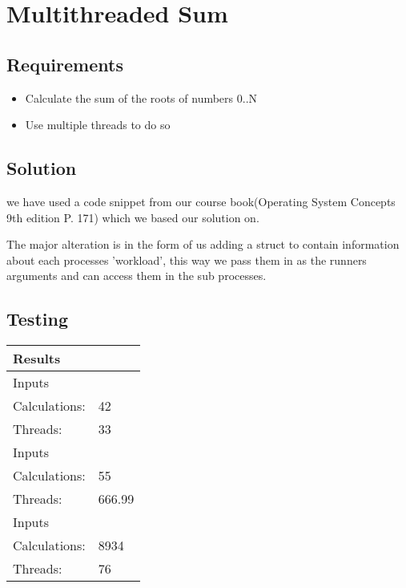 \chapter{Multithreaded Sum}

\section{Requirements}

\begin{itemize}
\item Calculate the sum of the roots of numbers 0..N
\item Use multiple threads to do so
\end{itemize}

\section{Solution}
we have used a code snippet from our course book(Operating System Concepts 9th edition P. 171) which we based our solution on.

The major alteration is in the form of us adding a struct to contain information about each processes 'workload', this way we pass them in as the runners arguments and can access them in the sub processes.

\section{Testing}



\newcommand{\tblhead}[1] {
\multicolumn{2}{l}{#1}\\
\hline
}

\newcommand{\row}[2] {
\hline
\rowcolor{gr1}
Inputs&\\
\hline \hline
\rowcolor{gr2}
Calculations: & #1 \\
\hline
\rowcolor{gr2}
Threads: & #2 \\
\hline \hline
}

\newcommand{\botrow}[2] {
\hline
\rowcolor{gr1}
Inputs&\\
\hline \hline
\rowcolor{gr2}
Calculations: & #1 \\
\hline
\rowcolor{gr2}
Threads: & #2 \\
\hline
}

\begin{table}
\begin{tabular}{| p{} | p{} |}
\tblhead{Results}
\row{42}{33}
\row{55}{666.99}
\botrow{8934}{76}
\end{tabular}
\end{table}